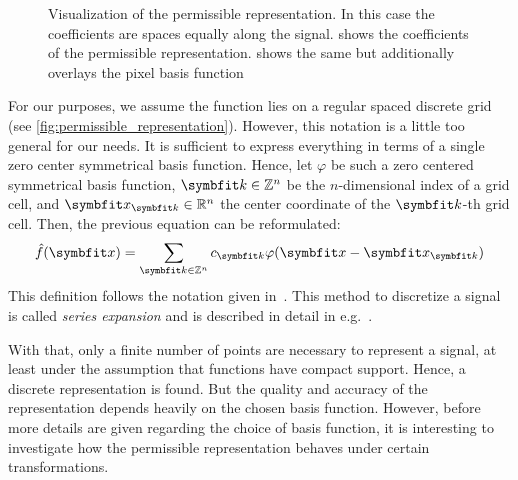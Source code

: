 \begin{figure}
	\centering
	\caption{Visualization of the permissible representation. In this case the
		coefficients are spaces equally along the signal.
		 shows the coefficients of the
		permissible representation.  shows the
		same but additionally overlays the pixel basis function
	}\label{fig:permissible_representation}
\end{figure}

For our purposes, we assume the function lies on a regular spaced discrete grid (see
\autoref{fig:permissible_representation}). However, this notation is a little too general for our
needs. It is sufficient to express everything in terms of a single zero center symmetrical basis
function. Hence, let \(\varphi\) be such a zero centered symmetrical basis function, \(\mvec{k} \in
\mathbb{Z}^n\) be the \(n\)-dimensional index of a grid cell, and \(\mvec{x}_{\mvec{k}} \in
\mathbb{R}^n\) the center coordinate of the \(\mvec{k}\)-th grid cell. Then, the previous equation
can be reformulated:
\begin{equation}
	\near{f}(\mvec{x}) = \sum_{\mvec{k} \in \mathbb{Z}^n} c_{\mvec{k}} \varphi(\mvec{x} - \mvec{x}_{\mvec{k}})
\end{equation}
This definition follows the notation given in~\cite{momey_new_2011}. This method to discretize a
signal is called \textit{series expansion} and is described in detail in
e.g.\ \cite{herman_basis_2015}.

With that, only a finite number of points are necessary to represent a signal, at least under the
assumption that functions have compact support. Hence, a discrete representation is found. But the
quality and accuracy of the representation depends heavily on the chosen basis function. However,
before more details are given regarding the choice of basis function, it is interesting to
investigate how the permissible representation behaves under certain transformations.

